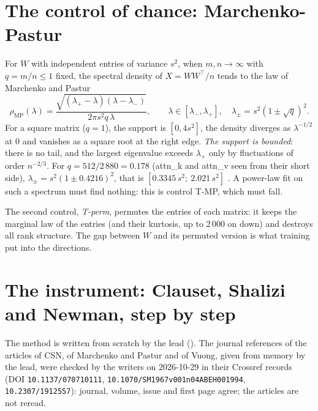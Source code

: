 \section{The control of chance: Marchenko-Pastur}\label{t3spe:sec:mp}

For $W$ with independent entries of variance $s^2$, when $m, n \to \infty$ with $q = m/n \le 1$ fixed, the spectral density of $X = WW^\top/n$ tends to the law of Marchenko and Pastur \cite{marchenko1967distribution}
\begin{equation}\label{t3spe:eq:mp}
\rho_{\mathrm{MP}}(\lambda) = \frac{\sqrt{(\lambda_+ - \lambda)(\lambda - \lambda_-)}}{2\pi s^2 q\,\lambda}, \qquad \lambda \in [\lambda_-, \lambda_+], \quad \lambda_\pm = s^2(1 \pm \sqrt q)^2 .
\end{equation}
For a square matrix ($q = 1$), the support is $[0, 4s^2]$, the density diverges as $\lambda^{-1/2}$ at 0 and vanishes as a square root at the right edge. \emph{The support is bounded}: there is no tail, and the largest eigenvalue exceeds $\lambda_+$ only by fluctuations of order $n^{-2/3}$. For $q = 512/2\,880 = 0.178$ (attn\_k and attn\_v seen from their short side), $\lambda_\pm = s^2(1 \pm 0.4216)^2$, that is $[0.3345\,s^2;\ 2.021\,s^2]$ \calc. A power-law fit on such a spectrum must find nothing: this is control T-MP, which must fall.

The second control, \emph{T-perm}, permutes the entries of each matrix: it keeps the marginal law of the entries (and their kurtosis, up to 2\,000 on down) and destroys all rank structure. The gap between $W$ and its permuted version is what training put into the directions.

\section{The instrument: Clauset, Shalizi and Newman, step by step}\label{t3spe:sec:csn}

The method \cite{clauset2009power} is written from scratch by the lead (). The journal references of the articles of CSN, of Marchenko and Pastur and of Vuong, given from memory by the lead, were checked by the writers on 2026-10-29 in their Crossref records (DOI \texttt{10.1137/070710111}, \texttt{10.1070/SM1967v001n04ABEH001994}, \texttt{10.2307/1912557}): journal, volume, issue and first page agree; the articles are not reread.


